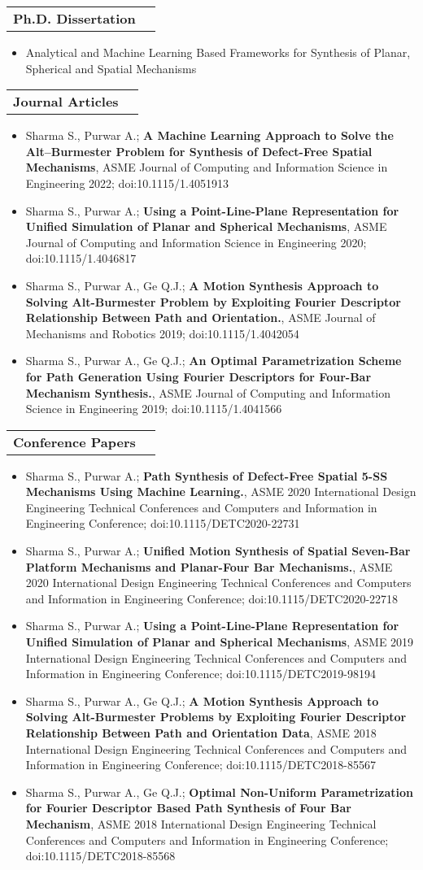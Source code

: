 \documentclass[letterpaper,10pt]{article}
\makeatletter
\newcommand{\resumeHeadingwithDate}[2]{
	\vspace{-1pt}
	\begin{tabular*}{0.97\textwidth}{l@{\extracolsep{\fill}}r}
		\textbf{#1} &  \textit{\small#2} \vspace{-2pt}\\
	\end{tabular*}
	\vspace{+2pt}
}
\newcommand{\resumeItemListStart}{
\vspace{-7pt}
\begin{itemize}[leftmargin=14pt]
}
\newcommand{\resumeItemListEnd}{
\vspace{+7pt}
\end{itemize}
}
\newcommand{\resumeItem}[1]{
  \item\small{
      {#1 \vspace{-7pt}
      }
  }
}
\makeatother
\begin{document}
\resumeHeadingwithDate{Ph.D. Dissertation}{}
\resumeItemListStart
\resumeItem{Analytical and Machine Learning Based Frameworks for Synthesis of Planar, Spherical and Spatial Mechanisms}
\resumeItemListEnd

\resumeHeadingwithDate{Journal Articles}{}
\resumeItemListStart
\resumeItem{Sharma S., Purwar A.;  \textbf{A Machine Learning Approach to Solve the Alt–Burmester Problem for Synthesis of Defect-Free Spatial Mechanisms}, ASME Journal of Computing and Information Science in Engineering 2022; doi:10.1115/1.4051913}
\resumeItem{Sharma S., Purwar A.; \textbf{Using a Point-Line-Plane Representation for Unified Simulation of Planar and Spherical Mechanisms}, ASME Journal of Computing and Information Science in Engineering 2020; doi:10.1115/1.4046817}
\resumeItem{Sharma S., Purwar A., Ge Q.J.; \textbf{A Motion Synthesis Approach to Solving Alt-Burmester Problem by Exploiting Fourier Descriptor Relationship Between Path and Orientation.}, ASME Journal of Mechanisms and Robotics 2019; doi:10.1115/1.4042054}
\resumeItem{Sharma S., Purwar A., Ge Q.J.; \textbf{An Optimal Parametrization Scheme for Path Generation Using Fourier Descriptors for Four-Bar Mechanism Synthesis.}, ASME Journal of Computing and Information Science in Engineering 2019; doi:10.1115/1.4041566}
\resumeItemListEnd

\resumeHeadingwithDate{Conference Papers}{}
\resumeItemListStart
\resumeItem{Sharma S., Purwar A.; \textbf{Path Synthesis of Defect-Free Spatial 5-SS Mechanisms Using Machine Learning.}, ASME 2020 International Design Engineering Technical Conferences and Computers and Information in Engineering Conference; doi:10.1115/DETC2020-22731}
\resumeItem{Sharma S., Purwar A.; \textbf{Unified Motion Synthesis of Spatial Seven-Bar Platform Mechanisms and Planar-Four Bar Mechanisms.}, ASME 2020 International Design Engineering Technical Conferences and Computers and Information in Engineering Conference; doi:10.1115/DETC2020-22718}
\resumeItem{Sharma S., Purwar A.; \textbf{Using a Point-Line-Plane Representation for Unified Simulation of Planar and Spherical Mechanisms}, ASME 2019 International Design Engineering Technical Conferences and Computers and Information in Engineering Conference; doi:10.1115/DETC2019-98194}
\resumeItem{Sharma S., Purwar A., Ge Q.J.; \textbf{A Motion Synthesis Approach to Solving Alt-Burmester Problems by Exploiting Fourier Descriptor Relationship Between Path and Orientation Data}, ASME 2018 International Design Engineering Technical Conferences and Computers and Information in Engineering Conference; doi:10.1115/DETC2018-85567}
\resumeItem{Sharma S., Purwar A., Ge Q.J.; \textbf{Optimal Non-Uniform Parametrization for Fourier Descriptor Based Path Synthesis of Four Bar Mechanism}, ASME 2018 International Design Engineering Technical Conferences and Computers and Information in Engineering Conference; doi:10.1115/DETC2018-85568}
\resumeItemListEnd
\end{document}
